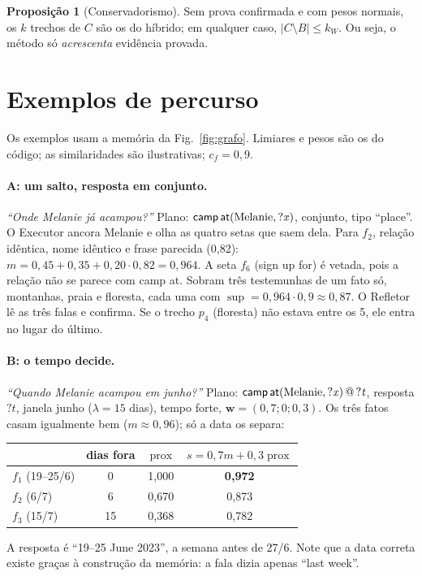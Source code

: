 \documentclass[10pt,twocolumn]{article}
\theoremstyle{definition}
\newtheorem{proposicao}{Proposição}
\newcommand{\rel}[1]{\textsf{#1}}
\newcommand{\V}[1]{\mathord{?}\mathit{#1}}
\newcommand{\prox}{\operatorname{prox}}
\DeclareMathOperator{\supp}{sup}
\begin{document}
\begin{proposicao}[Conservadorismo]
Sem prova confirmada e com pesos normais, os $k$ trechos de $C$ são os do
híbrido; em qualquer caso, $|C\setminus B|\le k_W$.
Ou seja, o método só \emph{acrescenta} evidência provada.
\end{proposicao}

\section{Exemplos de percurso}
\label{sec:exemplos}

Os exemplos usam a memória da Fig.~\ref{fig:grafo}. Limiares e pesos são os
do código; as similaridades são ilustrativas; $c_f=0{,}9$.

\paragraph{A: um salto, resposta em conjunto.} \emph{``Onde Melanie já
acampou?''} Plano: $\rel{camp\,at}(\text{Melanie},\V x)$, conjunto, tipo
``place''. O Executor ancora Melanie e olha as quatro setas que saem dela.
Para $f_2$, relação idêntica, nome idêntico e frase parecida (0{,}82):
$m=0{,}45+0{,}35+0{,}20\cdot0{,}82=0{,}964$. A seta $f_6$ (\rel{sign up for})
é vetada, pois a relação não se parece com \rel{camp at}. Sobram três
testemunhas de um fato só, montanhas, praia e floresta, cada uma com
$\supp=0{,}964\cdot0{,}9\approx0{,}87$. O Refletor lê as três falas e confirma.
Se o trecho $p_4$ (floresta) não estava entre os 5, ele entra no lugar do
último.

\paragraph{B: o tempo decide.} \emph{``Quando Melanie acampou em junho?''}
Plano: $\rel{camp\,at}(\text{Melanie},\V x)\,@\,\V t$, resposta $\V t$,
janela junho ($\lambda=15$ dias), tempo forte, $\mathbf w=(0{,}7;0;0{,}3)$.
Os três fatos casam igualmente bem ($m\approx0{,}96$); só a data os separa:
\begin{center}\small
\begin{tabular}{@{}lccc@{}}
\toprule
 & dias fora & $\prox$ & $s=0{,}7m+0{,}3\prox$ \\
\midrule
$f_1$ (19--25/6) & 0 & 1{,}000 & \textbf{0{,}972} \\
$f_2$ (6/7) & 6 & 0{,}670 & 0{,}873 \\
$f_3$ (15/7) & 15 & 0{,}368 & 0{,}782 \\
\bottomrule
\end{tabular}
\end{center}
A resposta é ``19--25 June 2023'', a semana antes de 27/6. Note que a data
correta existe graças à construção da memória: a fala dizia apenas ``last week''.
\end{document}
